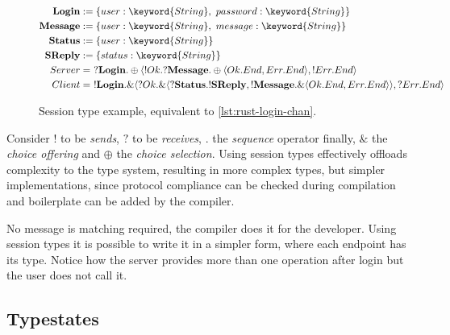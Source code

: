 \begin{figure}
    \begin{align*}
        \mathbf{Login}   & := \{user: \keyword{String},~password: \keyword{String}\}                                                                                                 \\
        \mathbf{Message} & := \{user: \keyword{String},~message: \keyword{String}\}                                                                                                  \\
        \mathbf{Status}  & := \{user: \keyword{String}\}                                                                                                                             \\
        \mathbf{SReply}  & := \{status: \keyword{String}\}                                                                                                                           \\
        Server           & = ~?\mathbf{Login}.\oplus\langle !Ok.?\mathbf{Message}.\oplus\langle Ok.End, Err.End \rangle, !Err.End\rangle                                             \\
        Client           & = ~!\mathbf{Login}.\&\langle ?Ok.\&\langle ?\mathbf{Status}.!\mathbf{SReply}, !\mathbf{Message}.\&\langle Ok.End, Err.End \rangle\rangle, ?Err.End\rangle
    \end{align*}
    \caption{Session type example, equivalent to \autoref{lst:rust-login-chan}.}
    \label{eq:session-types}
\end{figure}

Consider $!$ to be \emph{sends}, $?$ to be \emph{receives}, $.$ the \emph{sequence} operator finally,
$\&$ the \emph{choice offering} and $\oplus$ the \emph{choice selection}.
Using session types effectively offloads complexity to the type system,
resulting in more complex types, but simpler implementations,
since protocol compliance can be checked during compilation and boilerplate can be added by the compiler.

No message is matching required, the compiler does it for the developer.
Using session types it is possible to write it in a simpler form,
where each endpoint has its type.
Notice how the server provides more than one operation after login but the user does not call it.

\subsection{Typestates}\label{sec:typestates}

